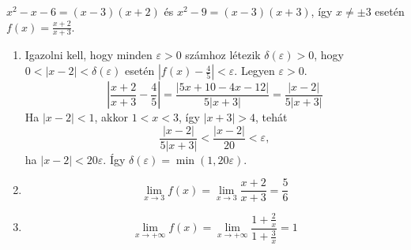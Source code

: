 \documentclass[11pt]{scrartcl}
\begin{document}
$x^2 - x - 6 = (x - 3)(x + 2)$ és $x^2 - 9 = (x - 3)(x + 3)$, így
$x \ne \pm 3$ esetén \(f(x) = \frac{x + 2}{x + 3}\).
\begin{enumerate}
	\item Igazolni kell, hogy minden $\varepsilon > 0$ számhoz létezik
	      $\delta(\varepsilon) > 0$, hogy $0 < |x - 2| < \delta(\varepsilon)$
	      esetén $\left| f(x) - \frac{4}{5} \right| < \varepsilon$. Legyen
	      $\varepsilon > 0$.
	      \[
		      \left| \frac{x + 2}{x + 3} - \frac{4}{5} \right|
		      = \frac{|5x + 10 - 4x - 12|}{5|x + 3|}
		      = \frac{|x - 2|}{5|x + 3|}
	      \]
	      Ha $|x - 2| < 1$, akkor $1 < x < 3$, így $|x + 3| > 4$, tehát
	      \[
		      \frac{|x - 2|}{5|x + 3|} < \frac{|x - 2|}{20} < \varepsilon,
	      \]
	      ha $|x - 2| < 20\varepsilon$. Így
	      $\delta(\varepsilon) = \min(1, 20\varepsilon)$.

	\item \[
		      \lim_{x \to 3} f(x)
		      = \lim_{x \to 3} \frac{x + 2}{x + 3}
		      = \frac{5}{6}
	      \]

	\item \[
		      \lim_{x \to +\infty} f(x)
		      = \lim_{x \to +\infty} \frac{1 + \frac{2}{x}}{1 + \frac{3}{x}}
		      = 1
	      \]
\end{enumerate}
\end{document}
